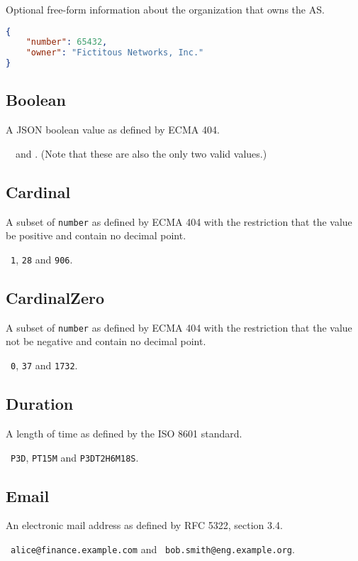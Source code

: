 \documentclass[10pt]{article}
\begin{document}
 Optional free-form information about the
organization that owns the AS.

\example
\begin{lstlisting}[language=json]
{
    "number": 65432,
    "owner": "Fictitous Networks, Inc."
}
\end{lstlisting}




\subsection{Boolean}
A JSON boolean value as defined by ECMA 404.

\example\ \true\ and \false.  (Note that these are also
the only two valid values.)


\subsection{Cardinal}
A subset of {\tt number} as defined by ECMA 404 with the restriction
that the value be positive and contain no decimal point.

\example\ {\tt 1}, {\tt 28} and {\tt 906}.


\subsection{CardinalZero}
A subset of {\tt number} as defined by ECMA 404 with the restriction
that the value not be negative and contain no decimal point.

\example\ {\tt 0}, {\tt 37} and {\tt 1732}.



\subsection{Duration}
A length of time as defined by the ISO 8601 standard.

\example\ {\tt P3D}, {\tt PT15M} and {\tt P3DT2H6M18S}.


\subsection{Email}
An electronic mail address as defined by RFC 5322, section 3.4.

\example\ {\tt alice@finance.example.com} and {\tt
  bob.smith@eng.example.org}.

\end{document}
